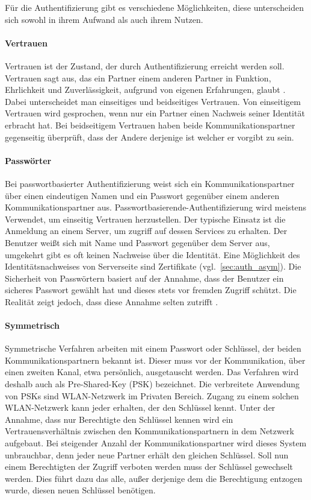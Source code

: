 \documentclass[11pt,a4paper]{report}
\begin{document}
Für die Authentifizierung gibt es verschiedene Möglichkeiten, diese unterscheiden sich sowohl in ihrem Aufwand als auch ihrem Nutzen.

\paragraph{Vertrauen}

Vertrauen ist der Zustand, der durch Authentifizierung erreicht werden soll. Vertrauen sagt aus, das ein Partner einem anderen Partner in Funktion, Ehrlichkeit und Zuverlässigkeit, aufgrund von eigenen Erfahrungen, glaubt \cite{chen}. Dabei unterscheidet man einseitiges und beidseitiges Vertrauen. Von einseitigem Vertrauen wird gesprochen, wenn nur ein Partner einen Nachweis seiner Identität erbracht hat. Bei beidseitigem Vertrauen haben beide Kommunikationspartner gegenseitig überprüft, dass der Andere derjenige ist welcher er vorgibt zu sein.

\paragraph{Passwörter}

Bei passwortbasierter Authentifizierung weist sich ein Kommunikationspartner über einen eindeutigen Namen und ein Passwort gegenüber einem anderen Kommunikationspartner aus. Passwortbasierende-Authentifizierung wird meistens Verwendet, um einseitig Vertrauen herzustellen. Der typische Einsatz ist die Anmeldung an einem Server, um zugriff auf dessen Services zu erhalten. Der Benutzer weißt sich mit Name und Passwort gegenüber dem Server aus, umgekehrt gibt es oft keinen Nachweise über die Identität. Eine Möglichkeit des Identitätsnachweises von Serverseite sind Zertifikate (vgl.~\ref{sec:auth_asym}). Die Sicherheit von Passwörtern basiert auf der Annahme, dass der Benutzer ein sicheres Passwort gewählt hat und dieses stets vor fremden Zugriff schützt. Die Realität zeigt jedoch, dass diese Annahme selten zutrifft \cite[s.~2]{gutmann}.

\paragraph{Symmetrisch}

Symmetrische Verfahren arbeiten mit einem Passwort oder Schlüssel, der beiden Kommunikationspartnern bekannt ist. Dieser muss vor der Kommunikation, über einen zweiten Kanal, etwa persönlich, ausgetauscht werden. Das Verfahren wird deshalb auch als Pre-Shared-Key (PSK) bezeichnet. Die verbreitete Anwendung von PSKs sind WLAN-Netzwerk im Privaten Bereich. Zugang zu einem solchen WLAN-Netzwerk kann jeder erhalten, der den Schlüssel kennt. Unter der Annahme, dass nur Berechtigte den Schlüssel kennen wird ein Vertrauensverhältnis zwischen den Kommunikationspartnern in dem Netzwerk aufgebaut. Bei steigender Anzahl der Kommunikationspartner wird dieses System unbrauchbar, denn jeder neue Partner erhält den gleichen Schlüssel. Soll nun einem Berechtigten der Zugriff verboten werden muss der Schlüssel gewechselt werden. Dies führt dazu das alle, außer derjenige dem die Berechtigung entzogen wurde, diesen neuen Schlüssel benötigen.
\end{document}
